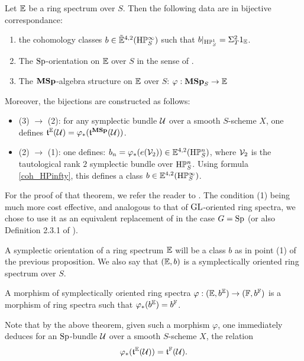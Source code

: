\begin{thm}\label{thm:PW_Sp-oriented}
Let $\mathbb E$ be a ring spectrum over $S$. Then the following data are in bijective
 correspondance:
\begin{enumerate}
\item the cohomology classes $b \in \tilde {\mathbb E}^{4,2}(\mathrm{H}\mathbb P^\infty_S)$ such
 that $b|_{\mathrm{H}\mathbb P^1_S}=\Sigma_T^2 1_\mathbb E$.
\item The $\mathrm{Sp}$-orientation on $\mathbb E$ over $S$ in the sense of .
\item The $\mathbf{MSp}$-algebra structure on $\mathbb E$ over $S$: $\varphi:\mathbf{MSp}_S \rightarrow \mathbb E$
\end{enumerate}
Moreover, the bijections are constructed as follows:
\begin{itemize}
\item (3) $\rightarrow$ (2): for any symplectic bundle $\mathcal U$ over a smooth $S$-scheme $X$,
 one defines $\mathfrak{t}^\mathbb E(\mathcal U)=\varphi_*(\mathfrak{t}^{\mathbf{MSp}}(\mathcal U))$.
\item (2) $\rightarrow$ (1): one defines: $b_n=\varphi_*(e(\mathcal V_{2})) \in \mathbb E^{4,2}(\mathrm{H}\mathbb P^n_S)$,
 where $\mathcal V_{2}$ is the tautological rank $2$ symplectic bundle over $\mathrm{H}\mathbb P^n_S$.
 Using formula \eqref{coh_HPinfty}, this defines a class $b \in \mathbb E^{4,2}(\mathrm{H}\mathbb P^\infty_S)$.
\end{itemize}
\end{thm}
For the proof of that theorem, we refer the reader to \cite[Th. 1.1]{PWcobord}.
The condition (1) being much more cost effective,
 and analogous to that of $\mathrm{GL}$-oriented ring spectra,
 we chose to use it as an equivalent replacement of  in the case $G=\mathrm{Sp}$
 (or also Definition 2.3.1 of \cite{DF3}).
\begin{df}\label{df:Sp-orientation}
A symplectic orientation of a ring spectrum $\mathbb E$ will be a class $b$
 as in point (1) of the previous proposition.
 We also say that $(\mathbb E,b)$ is a symplectically oriented ring spectrum over $S$.

A morphism of symplectically oriented ring spectra
 $\varphi:(\mathbb E,b^\mathbb E) \rightarrow (\mathbb F,b^\mathbb F)$ is a morphism of ring spectra
 such that $\varphi_*(b^\mathbb E)=b^\mathbb F$.
\end{df}
Note that by the above theorem, given such a morphism $\varphi$,
 one immediately deduces for an $\mathrm{Sp}$-bundle $\mathcal U$ over a smooth $S$-scheme $X$,
 the relation
\begin{equation}\label{eq:Sp-morphisms&Thom_classes}
\varphi_*(\mathfrak{t}^\mathbb E(\mathcal U))=\mathfrak{t}^\mathbb F(\mathcal U).
\end{equation}

